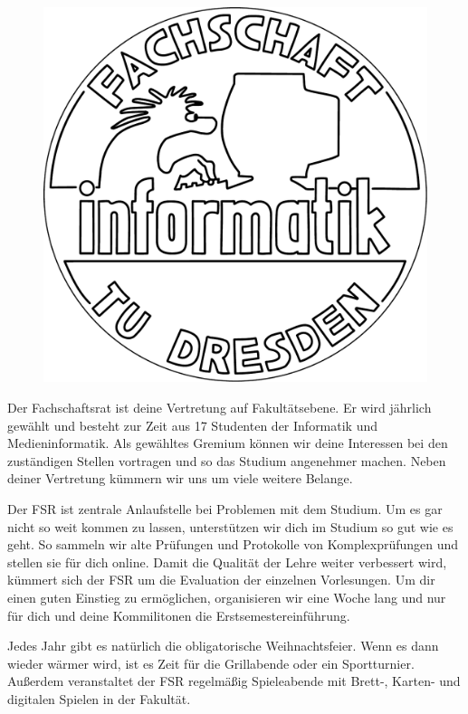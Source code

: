 

\begin{figure}\ \\[-2cm]
\flushright\includegraphics[width=.9\linewidth]{img/fsr_logo}
\end{figure}

Der Fachschaftsrat ist deine Vertretung auf Fakultätsebene.
Er wird jährlich gewählt und besteht zur Zeit aus 17 Studenten der Informatik und Medieninformatik.
Als gewähltes Gremium können wir deine Interessen bei den zuständigen Stellen vortragen und so das Studium angenehmer machen.
Neben deiner Vertretung kümmern wir uns um viele weitere Belange.

Der FSR ist zentrale Anlaufstelle bei Problemen mit dem Studium.
Um es gar nicht so weit kommen zu lassen, unterstützen wir dich im Studium so gut wie es geht.
So sammeln wir alte Prüfungen und Protokolle von Komplexprüfungen und stellen sie für dich online.
Damit die Qualität der Lehre weiter verbessert wird, kümmert sich der FSR um die Evaluation der einzelnen Vorlesungen.
Um dir einen guten Einstieg zu ermöglichen, organisieren wir eine Woche lang und nur für dich und deine Kommilitonen die Erstsemestereinführung.

Jedes Jahr gibt es natürlich die obligatorische Weihnachtsfeier.
Wenn es dann wieder wärmer wird, ist es Zeit für die Grillabende oder ein Sportturnier. \\
Außerdem veranstaltet der FSR regelmäßig Spieleabende mit Brett-, Karten- und digitalen Spielen in der Fakultät.

